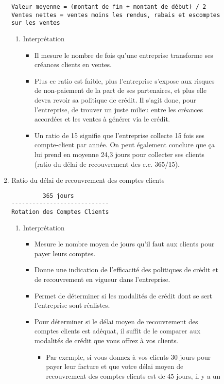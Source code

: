 \documentclass[11pt]{article}
\begin{document}
\begin{enumerate}
\begin{enumerate}
\begin{enumerate}
\begin{verbatim}
Valeur moyenne = (montant de fin + montant de début) / 2
Ventes nettes = ventes moins les rendus, rabais et escomptes sur les ventes
\end{verbatim}
\begin{enumerate}
\item Interprétation
\label{sec:orgcfaaf9b}
\begin{itemize}
\item Il mesure le nombre de fois qu’une entreprise transforme ses créances clients en
ventes.
\item Plus ce ratio est faible, plus l’entreprise s’expose aux risques de non-paiement de la
part de ses partenaires, et plus elle devra revoir sa politique de crédit. Il s’agit donc,
pour l’entreprise, de trouver un juste milieu entre les créances accordées et les ventes
à générer via le crédit.
\item Un ratio de 15 signifie que l’entreprise collecte 15 fois ses compte-client par année. On
peut également conclure que ça lui prend en moyenne 24,3 jours pour collecter ses
clients (ratio du délai de recouvrement des c.c. 365/15).
\end{itemize}
\end{enumerate}
\item Ratio du délai de recouvrement des comptes clients
\label{sec:orgb957c84}
\begin{verbatim}
         365 jours
----------------------------
Rotation des Comptes Clients
\end{verbatim}
\begin{enumerate}
\item Interprétation
\label{sec:orgc8bb3f7}
\begin{itemize}
\item Mesure le nombre moyen de jours qu’il faut aux clients pour payer leurs comptes.
\item Donne une indication de l’efficacité des politiques de crédit et de recouvrement en
vigueur dans l’entreprise.
\item Permet de déterminer si les modalités de crédit dont se sert l’entreprise sont réalistes.
\item Pour déterminer si le délai moyen de recouvrement des comptes clients est adéquat, il
suffit de le comparer aux modalités de crédit que vous offrez à vos clients.
\begin{itemize}
\item Par exemple, si vous donnez à vos clients 30 jours pour payer leur facture et que
votre délai moyen de recouvrement des comptes clients est de 45 jours, il y a un

\end{itemize}
\end{itemize}
\end{enumerate}
\end{enumerate}
\end{enumerate}
\end{enumerate}
\end{document}
